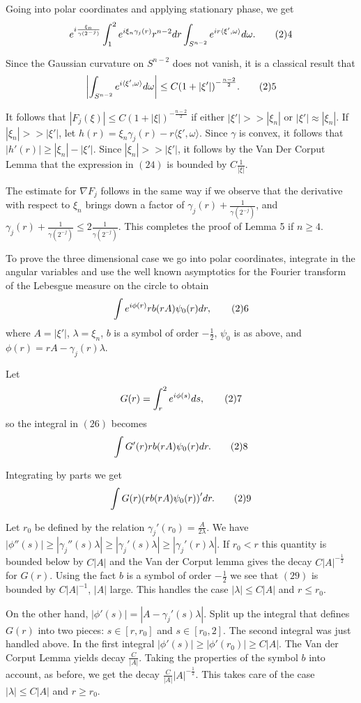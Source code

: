 Going into polar coordinates and applying stationary phase, we get  
$$ e^{i \frac{\xi_n}{\gamma(2^{-j})}} 
\int_{1}^{2} e^{i\xi_n \gamma_j(r)} r^{n-2} dr \int_{S^{n-2}} 
e^{ir \langle \xi', \omega \rangle} d\omega. \tag24$$ 

Since the Gaussian curvature on $S^{n-2}$ does not vanish, it is a 
classical result that 
$$ \left| \int_{S^{n-2}} e^{i \langle \xi', \omega \rangle} d\omega 
\right| \leq C{(1+|\xi'|)}^{-\frac{n-2}{2}}. \tag25$$ 

It follows that $|F_j(\xi)| \leq 
C{(1+|\xi|)}^{-\frac{n-2}{2}}$ if either $|\xi'| >> |\xi_n|$ or 
$|\xi'| \approx |\xi_n|$. If $|\xi_n| >> |\xi'|$, let $h(r)=\xi_n \gamma_j(r)
-r\langle \xi', \omega \rangle$. Since $\gamma$ is convex, it follows
that $|h'(r)| \ge |\xi_n|-|\xi'|$. Since $|\xi_n| >> |\xi'|$, it follows
by the Van Der Corput Lemma that the expression in $(24)$ is bounded by 
$C \frac{1}{|\xi|}$. 

The estimate for $\nabla F_j$ follows in the same way if we observe that 
the derivative with respect to $\xi_n$ brings down a factor of 
$\gamma_j(r)+\frac{1}{\gamma(2^{-j})}$,
and $\gamma_j(r) + \frac{1}{\gamma(2^{-j})} \leq 2 \frac{1}{\gamma(2^{-j})}$. 
This completes the proof of Lemma 5 if $n \ge 4$. 

To prove the three dimensional case we go into polar coordinates, integrate in the angular variables and use the well known asymptotics for the Fourier transform of the Lebesgue measure on the circle to obtain 
$$ \int e^{i\phi(r)} r b(rA) \psi_0(r)dr, \tag26$$ where $A=|\xi'|$, $\lambda=\xi_n$, $b$ is a symbol of order $-\frac{1}{2}$, $\psi_0$ is as above, and $\phi(r)=rA-\gamma_j(r)\lambda$. 

Let 
$$ G(r)=\int_{r}^{2} e^{i\phi(s)} ds, \tag27$$ so the integral in $(26)$ becomes  
$$ \int G'(r) r b(rA)\psi_0(r)dr. \tag28$$ 

Integrating by parts we get 
$$ \int G(r) {(r b(rA) \psi_0(r))}' dr. \tag29$$ 

Let $r_0$ be defined by the relation $\gamma_j'(r_0)=\frac{A}{2\lambda}$.
We have $|\phi''(s)| \ge |\gamma_j''(s) \lambda| \ge 
|\gamma_j'(s) \lambda| \ge |\gamma_j'(r) \lambda|$. If $r_0<r$ this quantity 
is bounded below by $C|A|$ and the Van der Corput lemma gives the decay  
$C{|A|}^{-\frac{1}{2}}$ for $G(r)$. Using the 
fact $b$ is a symbol of order $-\frac{1}{2}$ we see that $(29)$ is 
bounded by $C{|A|}^{-1}$, $|A|$ large. This handles the 
case $|\lambda| \leq C|A|$ and $r \leq r_0$. 

On the other hand, $|\phi'(s)|=|A-\gamma_j'(s)\lambda|$. Split up the integral 
that defines $G(r)$ into two pieces: $s \in [r,r_0]$ and $s \in [r_0,2]$. The
second integral was just handled above. In the first integral 
$|\phi'(s)| \ge |\phi'(r_0)| \ge C|A|$. The Van der Corput Lemma yields decay 
$\frac{C}{|A|}$. Taking the properties of the symbol $b$ into account, 
as before, we get the decay $\frac{C}{|A|} {|A|}^{-\frac{1}{2}}$. 
This takes care of the case $|\lambda| \leq C|A|$ and $r \ge r_0$.  

